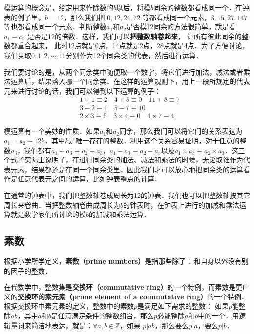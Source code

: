 模运算的概念是，给定用来作除数的$b$以后，将模$b$同余的整数都看成同一个．在钟表的例子里，$b=12$，那么我们把 $0,12,24,72$ 等都看成同一个元素，$3,15,27,147$ 等也都看成同一个元素．判断整数$a_1$和$a_2$是否模12同余的方法很简单，就是看 $a_1-a_2$ 是否是12的倍数．这样，我们可以\textbf{把整数轴卷起来}， 让所有彼此同余的整数都重合起来， 此时12点就是0点，14点就是2点，28点就是4点．为了方便讨论，我们只取$0,1,2,\cdots,11$分别作为12个同余类的代表，然后进行运算．

我们要讨论的是，从两个同余类中随便取一个数字，将它们进行加法，减法或者乘法运算后，结果落入哪一个同余类．在这样的运算规则下，用上一段所规定的代表元来进行讨论的话，我们可以得到以下运算的例子：
\begin{equation}
\begin{aligned}
&1+1\equiv 2 \quad 4+8\equiv 0 \quad 11+8\equiv 7 \\
&3-2\equiv 1 \quad 5-7\equiv 10 \\
&2\times 3\equiv 6 \quad 3\times 4\equiv 0 \quad 4\times 7\equiv 4
\end{aligned}
\end{equation}

模运算有一个美妙的性质．如果$a_1$和$a_2$同余，那么我们可以将它们的关系表达为$a_1=a_2+12k$，其中$k$是唯一存在的整数．利用这个关系容易证明，对于任意的整数$a_3$，我们都有$a_1+a_3\equiv a_2+a_3$，$a_1-a_3\equiv a_2-a_3$以及$a_1\times a_3\equiv a_2\times a_3$．这三个式子实际上说明了，在进行同余类的加法、减法和乘法的时候，无论取谁作为代表元素，结果都还是在同一个同余类里．因此我们才可以放心地把同余类的运算看作是任意代表元之间的运算，比如钟表整点的计算．

在通常的钟表中，我们把整数轴卷成周长为12的钟表．我们也可以把整数轴按其它周长来卷曲．当把整数轴卷曲成周长为$b$的钟表时，在钟表上进行的加减和乘法运算就是数学家们所讨论的模$b$的加减和乘法运算．

\subsection{素数}

根据小学所学定义，\textbf{素数（prime numbers）}是指那些除了 1 和自身以外没有别的因子的整数．

在代数学中，整数集是\textbf{交换环（commutative ring）}的一个特例，而素数是更广义的\textbf{交换环的素元素（prime element of a commutative ring）}的一个特例．根据交换环中素元素的定义，整数中的素数$p$是满足如下需求的整数：
如果$p$能整除$ab$，其中$a$和$b$是任意满足条件的整数组合，那么$p$必能整除$a$和$b$中的一个．用逻辑量词来简洁地表达，就是：$\forall a, b\in \mathbb{Z}$，如果 $p|ab$，那么要么$p|a$，要么$p|b$． 
